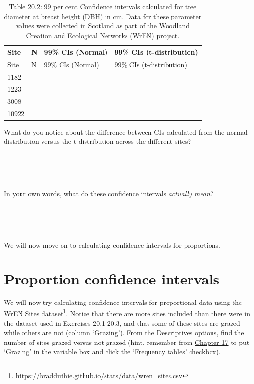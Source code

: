\documentclass[
]{scrbook}
\begin{document}
\begin{longtable}[]{@{}llll@{}}
\caption{Table 20.2: 99 per cent Confidence intervals calculated for tree diameter at breast height (DBH) in cm. Data for these parameter values were collected in Scotland as part of the Woodland Creation and Ecological Networks (WrEN) project.}\tabularnewline
\toprule
Site & N & 99\% CIs (Normal) & 99\% CIs (t-distribution) \\
\midrule
\endfirsthead
\toprule
Site & N & 99\% CIs (Normal) & 99\% CIs (t-distribution) \\
\midrule
\endhead
1182 & & & \\
1223 & & & \\
3008 & & & \\
10922 & & & \\
\bottomrule
\end{longtable}

What do you notice about the difference between CIs calculated from the normal distribution versus the t-distribution across the different sites?

\begin{verbatim}




\end{verbatim}

In your own words, what do these confidence intervals \emph{actually mean}?

\begin{verbatim}




\end{verbatim}

We will now move on to calculating confidence intervals for proportions.

\hypertarget{proportion-confidence-intervals}{%
\section{Proportion confidence intervals}\label{proportion-confidence-intervals}}

We will now try calculating confidence intervals for proportional data using the WrEN Sites dataset\footnote{\url{https://bradduthie.github.io/stats/data/wren_sites.csv}}.
Notice that there are more sites included than there were in the dataset used in Exercises 20.1-20.3, and that some of these sites are grazed while others are not (column `Grazing').
From the Descriptives options, find the number of sites grazed versus not grazed (hint, remember from \protect\hyperlink{Chapter_17}{Chapter 17} to put `Grazing' in the variable box and click the `Frequency tables' checkbox).
\end{document}
